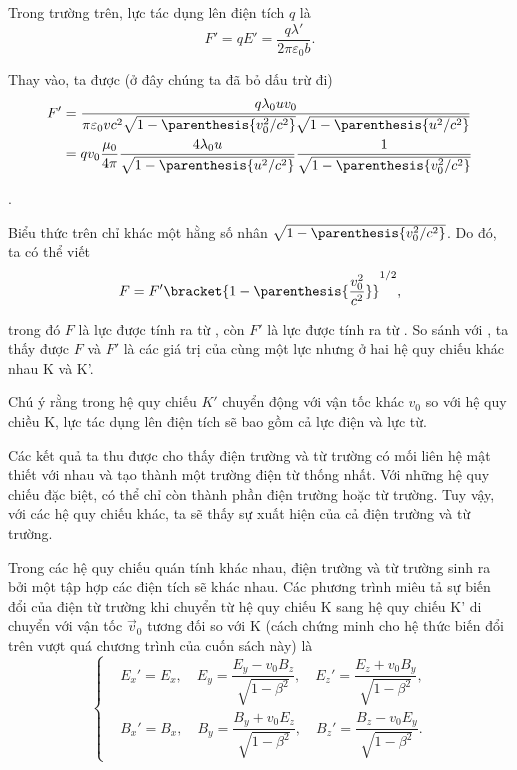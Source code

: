 \noindent
Trong trường trên, lực tác dụng lên điện tích $q$ là 
\begin{equation*}
    F' = q E' = \frac{q \lambda'}{2\pi\varepsilon_0 b}.
\end{equation*}

\noindent
Thay  vào, ta được (ở đây chúng ta đã bỏ dấu trừ đi)
\begin{align}
    F' &= \frac{q\lambda_0 u v_0}{ \pi\varepsilon_0 vc^2 \sqrt{1 - \parenthesis{v_0^2/c^2}} \sqrt{1 - \parenthesis{u^2/c^2}} } \nonumber\\
    &= qv_0 \frac{\mu_0}{4\pi} \frac{4\lambda_0 u}{\sqrt{1 - \parenthesis{u^2/c^2}}} \frac{1}{\sqrt{1 - \parenthesis{v_0^2/c^2}}} \label{eq:6_58}
\end{align}

\noindent
[lưu ý rằng $\mu_0=1/(\varepsilon_0c^2)$; xem lại \eqn{6_15}].

Biểu thức trên chỉ khác  một hằng số nhân $\sqrt{1 - \parenthesis{v_0^2/c^2}}$. Do đó, ta có thể viết
\begin{equation*}
    F = F' \bracket{ 1 - \parenthesis{\frac{v_0^2}{c^2}} }^{1/2},
\end{equation*}

\noindent
trong đó $F$ là lực được tính ra từ , còn $F'$ là lực được tính ra từ . So sánh với , ta thấy được $F$ và $F'$ là các giá trị của cùng một lực nhưng ở hai hệ quy chiếu khác nhau K và K'.

Chú ý rằng trong hệ quy chiếu $K'$ chuyển động với vận tốc khác $v_0$ so với hệ quy chiều K, lực tác dụng lên điện tích sẽ bao gồm cả lực điện và lực từ.

Các kết quả ta thu được cho thấy điện trường và từ trường có mối liên hệ mật thiết với nhau và tạo thành một trường điện từ thống nhất. Với những hệ quy chiếu đặc biệt, có thể chỉ còn thành phần điện trường hoặc từ trường. Tuy vậy, với các hệ quy chiếu khác, ta sẽ thấy sự xuất hiện của cả điện trường và từ trường.

Trong các hệ quy chiếu quán tính khác nhau, điện trường và từ trường sinh ra bởi một tập hợp các điện tích sẽ khác nhau. Các phương trình miêu tả sự biến đổi của điện từ trường khi chuyển từ hệ quy chiếu K sang hệ quy chiếu K' di chuyển với vận tốc $\vec{v}_0$ tương đối so với K (cách chứng minh cho hệ thức biến đổi trên vượt quá chương trình của cuốn sách này) là
\begin{equation}\label{eq:6_59}
    \begin{cases}
        & \!\!\!\!\! E_x' = E_x,\quad E_y = \dfrac{E_y-v_0B_z}{\sqrt{1-\beta^2}},\quad E_z' = \dfrac{E_z+v_0B_y}{\sqrt{1-\beta^2}},\\
        & \!\!\!\!\! B_x' = B_x,\quad B_y = \dfrac{B_y+v_0E_z}{\sqrt{1-\beta^2}},\quad B_z' = \dfrac{B_z-v_0E_y}{\sqrt{1-\beta^2}}.
    \end{cases}
\end{equation}

